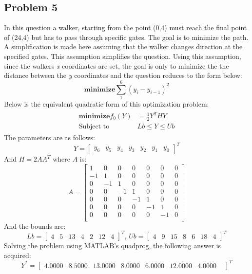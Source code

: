 \documentclass[a4paper]{article}
\begin{document}
\begin{Large}
	\section*{Problem 5}
	In this question a walker, starting from the point (0,4) must reach the final point of (24,4) but has to pass through specific gates. The goal is to minimize the path. A simplification is made here assuming that the walker changes direction at the specified gates. This assumption simplifies the question. Using this assumption, since the walkers \textit{x} coordinates are set, the goal is only to minimize the the distance between the \textit{y} coordinates and the question reduces to the form below:
	\begin{equation}\label{key}
	\mathbf{minimize} \sum_{1}^{6}(y_{i}-y_{i-1})^2
	\end{equation}
	Below is the equivalent quadratic form of this optimization problem:
	\begin{align}
		\begin{split}
		\mathbf{minimize} f_0(Y)&=\frac{1}{2}Y^THY\\
		\text{Subject to  } &Lb \leq Y \leq Ub
		\end{split}
	\end{align}
	The parameters are as follows:
	\[
	Y={\begin{bmatrix}
	y_6 & y_5 & y_4 & y_3 & y_2 & y_1 & y_0
	\end{bmatrix}}^T
	\]
	And $ H = 2AA^T $ where $ A $ is:
	\[A=
	\begin{bmatrix}
	1 & 0 & 0 & 0 & 0 & 0 & 0\\
	-1 & 1 & 0 & 0 & 0 & 0 & 0\\
	0 & -1 & 1 & 0 & 0 & 0 & 0\\
	0 & 0 & -1 & 1 & 0 & 0 & 0\\
	0 & 0 & 0 & -1 & 1 & 0 & 0\\
	0 & 0 & 0 & 0 & -1 & 1 & 0\\
	0 & 0 & 0 & 0 & 0 & -1 & 0\\
	\end{bmatrix}
	\]
	And the bounds are:
	\[
	Lb={\begin{bmatrix}
	4 &5 &13 &4 &2 &12 &4
	\end{bmatrix}}^T
	\text{, }
	Ub={\begin{bmatrix}
	4 &9 &15 &8 &6& 18& 4
	\end{bmatrix}}^T
	\]
	Solving the problem using MATLAB's quadprog, the following answer is acquired:
	\[
	Y^*={\begin{bmatrix}
	4.0000 &
	8.5000&
	13.0000&
	8.0000&
	6.0000&
	12.0000&
	4.0000&
	\end{bmatrix}}^T
	\]
	\newpage

\end{Large}
\end{document}
